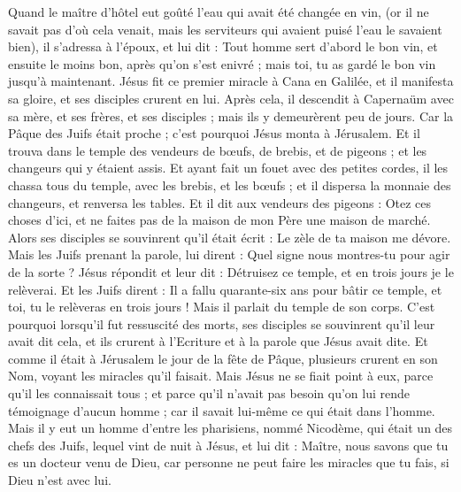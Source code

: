 \begin{multicols}{2}
Quand le maître d'hôtel eut goûté l'eau qui avait été changée en vin, (or il ne savait pas d'où cela venait, mais les serviteurs qui avaient puisé l'eau le savaient bien), il s'adressa à l'époux,
et lui dit : Tout homme sert d'abord le bon vin, et ensuite le moins bon, après qu'on s'est enivré ; mais toi, tu as gardé le bon vin jusqu'à maintenant.
Jésus fit ce premier miracle à Cana en Galilée, et il manifesta sa gloire, et ses disciples crurent en lui.
Après cela, il descendit à Capernaüm avec sa mère, et ses frères, et ses disciples ; mais ils y demeurèrent peu de jours.
Car la Pâque des Juifs était proche ; c'est pourquoi Jésus monta à Jérusalem.
Et il trouva dans le temple des vendeurs de bœufs, de brebis, et de pigeons ; et les changeurs qui y étaient assis.
Et ayant fait un fouet avec des petites cordes, il les chassa tous du temple, avec les brebis, et les bœufs ; et il dispersa la monnaie des changeurs, et renversa les tables.
Et il dit aux vendeurs des pigeons : Otez ces choses d'ici, et ne faites pas de la maison de mon Père une maison de marché.
Alors ses disciples se souvinrent qu'il était écrit : Le zèle de ta maison me dévore.
Mais les Juifs prenant la parole, lui dirent : Quel signe nous montres-tu pour agir de la sorte ?
Jésus répondit et leur dit : Détruisez ce temple, et en trois jours je le relèverai.
Et les Juifs dirent : Il a fallu quarante-six ans pour bâtir ce temple, et toi, tu le relèveras en trois jours !
Mais il parlait du temple de son corps.
C'est pourquoi lorsqu'il fut ressuscité des morts, ses disciples se souvinrent qu'il leur avait dit cela, et ils crurent à l'Ecriture et à la parole que Jésus avait dite.
Et comme il était à Jérusalem le jour de la fête de Pâque, plusieurs crurent en son Nom, voyant les miracles qu'il faisait.
Mais Jésus ne se fiait point à eux, parce qu'il les connaissait tous ;
et parce qu'il n'avait pas besoin qu'on lui rende témoignage d'aucun homme ; car il savait lui-même ce qui était dans l'homme.
\VerseOne{}Mais il y eut un homme d'entre les pharisiens, nommé Nicodème, qui était un des chefs des Juifs,
lequel vint de nuit à Jésus, et lui dit : Maître, nous savons que tu es un docteur venu de Dieu, car personne ne peut faire les miracles que tu fais, si Dieu n'est avec lui.

\end{multicols}
